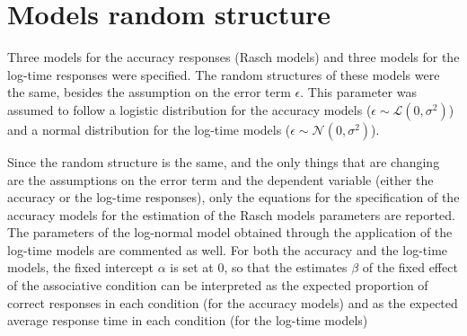 \documentclass[12pt]{book}
\begin{document}
\section{Models random structure}

Three models for the accuracy responses (Rasch models) and three models for the log-time responses were specified. The random structures of these models were the same, besides the assumption on the error term $\epsilon$. This parameter was assumed to follow a logistic distribution for the accuracy models ($\epsilon \sim \mathcal{L}(0, \sigma^2)$) and a normal distribution for the log-time models ($\epsilon \sim \mathcal{N}(0, \sigma^2)$). 

Since the random structure is the same, and the only things that are changing are the assumptions on the error term and the dependent variable (either the accuracy or the log-time responses), only the equations for the specification of the accuracy models for the estimation of the Rasch models parameters are reported. The parameters of the log-normal model obtained through the application of the log-time models are commented as well. For both the accuracy and the log-time models, the fixed intercept $\alpha$ is set at 0, so that the estimates $\beta$ of the fixed effect of the associative condition can be interpreted as the expected proportion of correct responses in each condition (for the accuracy models) and as the expected average response time in each condition (for the log-time models) 
\end{document}
